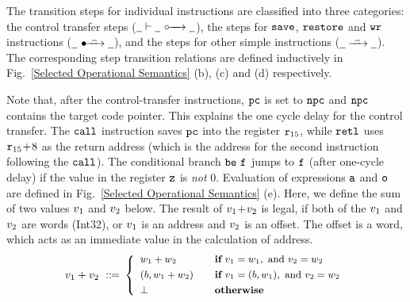 %				
%				
%				
%				

The transition steps for individual instructions are classified into
three categories: the control transfer steps
(${\underline{\ \,}} \vdash {\underline{\ \,}} \ \circ\mkern-7mu\xrightarrow{\quad} {\underline{\ \,}}$),
the steps for
$\texttt{save}$, $\texttt{restore}$ and $\texttt{wr}$ instructions
($\swtrans{\notCare}{\ \notCare\ }{\notCare}$),
and the steps
for other simple instructions
(${\underline{\ \,}} \xrightarrow{{\ \underline{\ \,}\ }} {\underline{\ \,}}$). The
corresponding step transition relations are defined inductively
in Fig.~\ref{Selected Operational Semantics} (b), (c) and (d)
respectively.

Note that, after the control-transfer instructions, $\texttt{pc}$ is set
to $\texttt{npc}$ and $\texttt{npc}$ contains the target code pointer. This explains
the one cycle delay for the control transfer.
The $\texttt{call}$ instruction saves $\texttt{pc}$ into the register $\texttt{r}_{15}$,
while $\texttt{retl}$ uses $\texttt{r}_{15} \!+\! 8$ as the
return address (which is the address for the second instruction
following the $\texttt{call}$).
The conditional branch $\texttt{be}{} \ \texttt{f}_{}$ jumps to $\texttt{f}_{}$ 
(after one-cycle delay) if 
the value in the register $\texttt{z}$ is {\em not} 0.
Evaluation of
expressions $\texttt{a}$ and $\texttt{o}$ are defined
in Fig.~\ref{Selected Operational Semantics} (e).
Here, we define the sum of two values $v_1$
and $v_2$ below. The result of $v_1\!+\!v_2$
is legal, if both of the $v_1$ and $v_2$
are words (Int32), or $v_1$ is an address and
$v_2$ is an offset. The offset is a word,
which acts as an immediate value in the
calculation of address.
\[
	\small
	v_1 + v_2 \ ::\!\!{=} \
	\left\{
		\begin{array}{ll}
			w_1 + w_2 & \quad \textbf{if} \
				v_1 = w_1, \text{ and }
				v_2 = w_2 \\
			\\[-8pt]
			(b, w_1 + w_2) & \quad
				\textbf{if} \
				v_1 = (b, w_1),
				\text{ and }
				v_2 = w_2 \\
			\\[-8pt]
			\perp & \quad \textbf{otherwise}
		\end{array}
	\right.
\]

